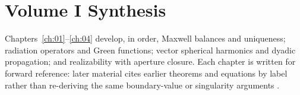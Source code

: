 \chapter*{Volume I Synthesis}
\label{ch:vol-i-synthesis}

\noindent
Chapters~\ref{ch:01}--\ref{ch:04} develop, in order, Maxwell balances and uniqueness; radiation operators and Green functions; vector spherical harmonics and dyadic propagation; and realizability with aperture closure. Each chapter is written for forward reference: later material cites earlier theorems and equations by label rather than re-deriving the same boundary-value or singularity arguments \cite{stratton1941,harrington2001,tai1994}.